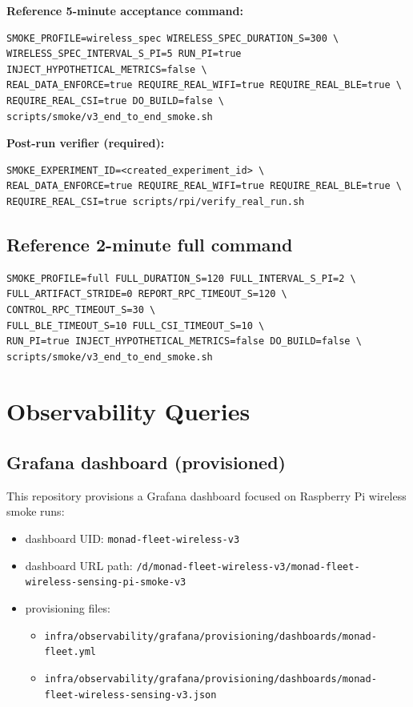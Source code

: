 \documentclass[11pt,a4paper]{article}
\begin{document}
\textbf{Reference 5-minute acceptance command:}
\begin{verbatim}
SMOKE_PROFILE=wireless_spec WIRELESS_SPEC_DURATION_S=300 \
WIRELESS_SPEC_INTERVAL_S_PI=5 RUN_PI=true INJECT_HYPOTHETICAL_METRICS=false \
REAL_DATA_ENFORCE=true REQUIRE_REAL_WIFI=true REQUIRE_REAL_BLE=true \
REQUIRE_REAL_CSI=true DO_BUILD=false \
scripts/smoke/v3_end_to_end_smoke.sh
\end{verbatim}

\textbf{Post-run verifier (required):}
\begin{verbatim}
SMOKE_EXPERIMENT_ID=<created_experiment_id> \
REAL_DATA_ENFORCE=true REQUIRE_REAL_WIFI=true REQUIRE_REAL_BLE=true \
REQUIRE_REAL_CSI=true scripts/rpi/verify_real_run.sh
\end{verbatim}

\subsection{Reference 2-minute full command}
\begin{verbatim}
SMOKE_PROFILE=full FULL_DURATION_S=120 FULL_INTERVAL_S_PI=2 \
FULL_ARTIFACT_STRIDE=0 REPORT_RPC_TIMEOUT_S=120 \
CONTROL_RPC_TIMEOUT_S=30 \
FULL_BLE_TIMEOUT_S=10 FULL_CSI_TIMEOUT_S=10 \
RUN_PI=true INJECT_HYPOTHETICAL_METRICS=false DO_BUILD=false \
scripts/smoke/v3_end_to_end_smoke.sh
\end{verbatim}

\section{Observability Queries}
\subsection{Grafana dashboard (provisioned)}
This repository provisions a Grafana dashboard focused on Raspberry Pi wireless smoke runs:
\begin{itemize}
  \item dashboard UID: \texttt{monad-fleet-wireless-v3}
  \item dashboard URL path: \texttt{/d/monad-fleet-wireless-v3/monad-fleet-wireless-sensing-pi-smoke-v3}
  \item provisioning files:
  \begin{itemize}
    \item \texttt{infra/observability/grafana/provisioning/dashboards/monad-fleet.yml}
    \item \texttt{infra/observability/grafana/provisioning/dashboards/monad-fleet-wireless-sensing-v3.json}
  \end{itemize}
\end{itemize}
\end{document}
